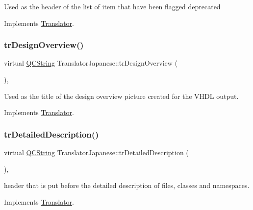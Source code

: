 Used as the header of the list of item that have been flagged deprecated 

Implements \mbox{\hyperlink{class_translator}{Translator}}.

\mbox{\label{class_translator_japanese_a87b3e18a60443505018343b719f61679}} 
\subsubsection{\texorpdfstring{trDesignOverview()}{trDesignOverview()}}
{\footnotesize\ttfamily virtual \mbox{\hyperlink{class_q_c_string}{Q\+C\+String}} Translator\+Japanese\+::tr\+Design\+Overview (\begin{DoxyParamCaption}{ }\end{DoxyParamCaption})\hspace{0.3cm}{\ttfamily [inline]}, {\ttfamily [virtual]}}

Used as the title of the design overview picture created for the V\+H\+DL output. 

Implements \mbox{\hyperlink{class_translator}{Translator}}.

\mbox{\label{class_translator_japanese_ad16cb36fd418dbcc99b6d87fa1950050}} 
\subsubsection{\texorpdfstring{trDetailedDescription()}{trDetailedDescription()}}
{\footnotesize\ttfamily virtual \mbox{\hyperlink{class_q_c_string}{Q\+C\+String}} Translator\+Japanese\+::tr\+Detailed\+Description (\begin{DoxyParamCaption}{ }\end{DoxyParamCaption})\hspace{0.3cm}{\ttfamily [inline]}, {\ttfamily [virtual]}}

header that is put before the detailed description of files, classes and namespaces. 

Implements \mbox{\hyperlink{class_translator}{Translator}}.

\mbox{\label{class_translator_japanese_a2777a4ec6aa939b008cbd34b9b084729}} 
